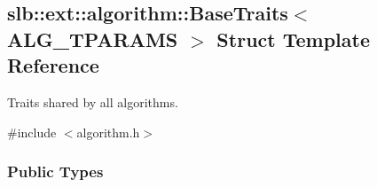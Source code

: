 \hypertarget{structslb_1_1ext_1_1algorithm_1_1BaseTraits}{}\subsection{slb\+:\+:ext\+:\+:algorithm\+:\+:Base\+Traits$<$ A\+L\+G\+\_\+\+T\+P\+A\+R\+A\+MS $>$ Struct Template Reference}
\label{structslb_1_1ext_1_1algorithm_1_1BaseTraits}


Traits shared by all algorithms.  




{\ttfamily \#include $<$algorithm.\+h$>$}

\subsubsection*{Public Types}
